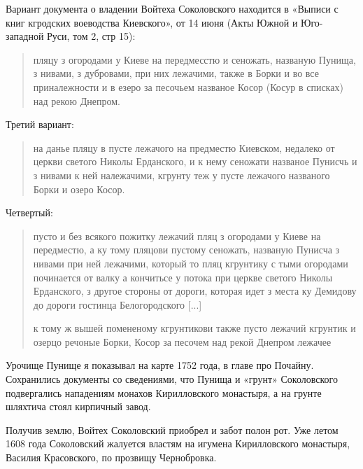 Вариант документа о владении Войтеха Соколовского находится в «Выписи с книг кгродских воеводства Киевского», от 14 июня (Акты Южной и Юго-западной Руси, том 2, стр 15):

\begin{quotation}
пляцу з огородами у Киеве на передмесстю и сеножать, названую Пунища, з нивами, з дубровами, при них лежачими, также в Борки и во все приналежности и в езеро за песочьем названое Косор (Косур в списках) над рекою Днепром.
\end{quotation}

Третий вариант:

\begin{quotation}
на данье пляцу в пусте лежачого на предместю Киевском, недалеко от церкви светого Николы Ерданского, и к нему сеножати названое Пунисчь и з нивами к ней належачими, кгрунту теж у пусте лежачого названого Борки и озеро Косор.
\end{quotation}

Четвертый:

\begin{quotation}
пусто и без всякого пожитку лежачий пляц з огородами у Киеве на передместю, а ку тому пляцови пустому сеножать, названую Пунисча з нивами при ней лежачими, который то пляц кгрунтику с тыми огородами починается от валку а кончитьсе у потока при церкве светого Николы Ерданского, з другое стороны от дороги, которая идет з места ку Демидову до дороги гостинца Белогородского [...]

к тому ж вышей помененому кгрунтикови также пусто лежачий кгрунтик и озерцо речоные Борки, Косор за песочем над рекой Днепром лежачее
\end{quotation}

Урочище Пунище я показывал на карте 1752 года, в главе про Почайну. Сохранились документы со сведениями, что Пунища и «грунт» Соколовского подвергались нападениям монахов Кирилловского монастыря, а на грунте шляхтича стоял кирпичный завод. 


Получив землю, Войтех Соколовский приобрел и забот полон рот. Уже летом 1608 года Соколовский жалуется властям на игумена Кирилловского монастыря, Василия Красовского, по прозвищу Чернобровка.


